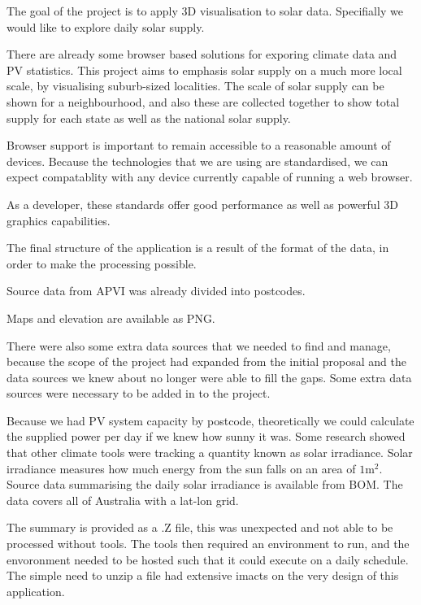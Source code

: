 \documentclass[12pt,a4paper]{report}
\begin{document}
The goal of the project is to apply 3D visualisation to solar data. Specifially we would like to explore daily solar supply.

There are already some browser based solutions for exporing climate data and PV statistics. This project aims to emphasis solar supply on a much more local scale, by visualising suburb-sized localities. The scale of solar supply can be shown for a neighbourhood, and also these are collected together to show total supply for each state as well as the national solar supply. 

Browser support is important to remain accessible to a reasonable amount of devices. Because the technologies that we are using are standardised, we can expect compatablity with any device currently capable of running a web browser. 

As a developer, these standards offer good performance as well as powerful 3D graphics capabilities.

The final structure of the application is a result of the format of the data, in order to make the processing possible.

Source data from APVI was already divided into postcodes.

Maps and elevation are available as PNG.

There were also some extra data sources that we needed to find and manage, because the scope of the project had expanded from the initial proposal and the data sources we knew about no longer were able to fill the gaps. Some extra data sources were necessary to be added in to the project.

Because we had PV system capacity by postcode, theoretically we could calculate the supplied power per day if we knew how sunny it was. Some research showed that other climate tools were tracking a quantity known as solar irradiance. Solar irradiance measures how much energy from the sun falls on an area of $1 \text{m}^2$. Source data summarising the daily solar irradiance is available from BOM. The data covers all of Australia with a lat-lon grid. 

The summary is provided as a .Z file, this was unexpected and not able to be processed without tools. The tools then required an environment to run, and the envoronment needed to be hosted such that it could execute on a daily schedule. The simple need to unzip a file had extensive imacts on the very design of this application.
\end{document}
